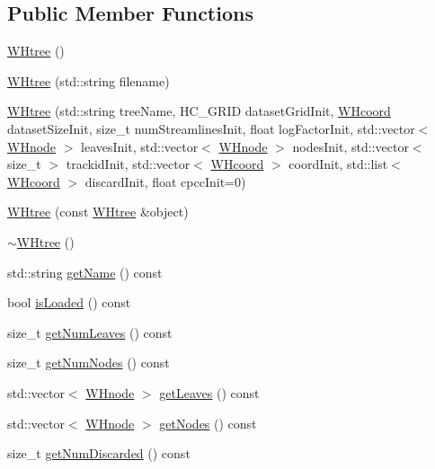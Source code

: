 \subsection*{\-Public \-Member \-Functions}
\begin{DoxyCompactItemize}
\item 
\hyperlink{classWHtree_a089379c94e81e3347630f3d93d2445ac}{\-W\-Htree} ()
\item 
\hyperlink{classWHtree_a68fe52e6dc0adfb2220a7bee729cf244}{\-W\-Htree} (std\-::string filename)
\item 
\hyperlink{classWHtree_adc8aaafe88e7b50c3c013e76566f024d}{\-W\-Htree} (std\-::string tree\-Name, \-H\-C\-\_\-\-G\-R\-I\-D dataset\-Grid\-Init, \hyperlink{classWHcoord}{\-W\-Hcoord} dataset\-Size\-Init, size\-\_\-t num\-Streamlines\-Init, float log\-Factor\-Init, std\-::vector$<$ \hyperlink{classWHnode}{\-W\-Hnode} $>$ leaves\-Init, std\-::vector$<$ \hyperlink{classWHnode}{\-W\-Hnode} $>$ nodes\-Init, std\-::vector$<$ size\-\_\-t $>$ trackid\-Init, std\-::vector$<$ \hyperlink{classWHcoord}{\-W\-Hcoord} $>$ coord\-Init, std\-::list$<$ \hyperlink{classWHcoord}{\-W\-Hcoord} $>$ discard\-Init, float cpcc\-Init=0)
\item 
\hyperlink{classWHtree_ae6b2a4197e7522bf70492944755dad32}{\-W\-Htree} (const \hyperlink{classWHtree}{\-W\-Htree} \&object)
\item 
\hyperlink{classWHtree_aef3c0090b9b4ef6c80cd78798f786640}{$\sim$\-W\-Htree} ()
\item 
std\-::string \hyperlink{classWHtree_ac96c308f4fd7d214058de9a99f345400}{get\-Name} () const 
\item 
bool \hyperlink{classWHtree_a80c4bf2ca9f2418a9008d319ffd4567e}{is\-Loaded} () const 
\item 
size\-\_\-t \hyperlink{classWHtree_ab03e43500c6fde88ef3de0d4b5dae1a6}{get\-Num\-Leaves} () const 
\item 
size\-\_\-t \hyperlink{classWHtree_a2d54d764bc0251f439e0de29f521fb73}{get\-Num\-Nodes} () const 
\item 
std\-::vector$<$ \hyperlink{classWHnode}{\-W\-Hnode} $>$ \hyperlink{classWHtree_aa3f0daadbe8934acc6cee4442cd0a171}{get\-Leaves} () const 
\item 
std\-::vector$<$ \hyperlink{classWHnode}{\-W\-Hnode} $>$ \hyperlink{classWHtree_a1bbc4d264f8f4adfd8e184865f797468}{get\-Nodes} () const 
\item 
size\-\_\-t \hyperlink{classWHtree_ab3386a346f77f836797f7de87833e2f6}{get\-Num\-Discarded} () const 
\item 

\end{DoxyCompactItemize}
